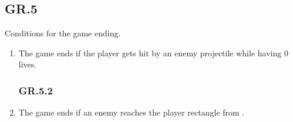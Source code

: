 \documentclass[12pt, letterpaper]{article}
\begin{document}
    \subsection*{GR.5}
    Conditions for the game ending. 
    \begin{enumerate}[label=]
        \subsubsection*{GR.5.1}
        \item The game ends if the player gets hit by an enemy projectile while having 0 lives. 
        \subsubsection*{GR.5.2}
        \item The game ends if an enemy reaches the player rectangle from .
    \end{enumerate}    
\end{document}
